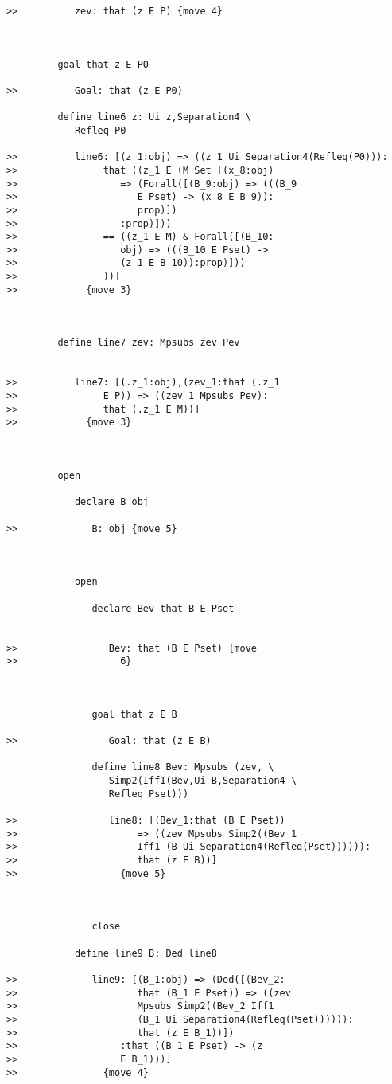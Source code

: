 \documentclass[12pt]{article}
\begin{document}
\begin{verbatim}
>>          zev: that (z E P) {move 4}



         goal that z E P0

>>          Goal: that (z E P0)

         define line6 z: Ui z,Separation4 \
            Refleq P0

>>          line6: [(z_1:obj) => ((z_1 Ui Separation4(Refleq(P0))):
>>               that ((z_1 E (M Set [(x_8:obj)
>>                  => (Forall([(B_9:obj) => (((B_9
>>                     E Pset) -> (x_8 E B_9)):
>>                     prop)])
>>                  :prop)]))
>>               == ((z_1 E M) & Forall([(B_10:
>>                  obj) => (((B_10 E Pset) ->
>>                  (z_1 E B_10)):prop)]))
>>               ))]
>>            {move 3}



         define line7 zev: Mpsubs zev Pev


>>          line7: [(.z_1:obj),(zev_1:that (.z_1
>>               E P)) => ((zev_1 Mpsubs Pev):
>>               that (.z_1 E M))]
>>            {move 3}



         open

            declare B obj

>>             B: obj {move 5}



            open

               declare Bev that B E Pset


>>                Bev: that (B E Pset) {move
>>                  6}



               goal that z E B

>>                Goal: that (z E B)

               define line8 Bev: Mpsubs (zev, \
                  Simp2(Iff1(Bev,Ui B,Separation4 \
                  Refleq Pset)))

>>                line8: [(Bev_1:that (B E Pset))
>>                     => ((zev Mpsubs Simp2((Bev_1
>>                     Iff1 (B Ui Separation4(Refleq(Pset)))))):
>>                     that (z E B))]
>>                  {move 5}



               close

            define line9 B: Ded line8

>>             line9: [(B_1:obj) => (Ded([(Bev_2:
>>                     that (B_1 E Pset)) => ((zev
>>                     Mpsubs Simp2((Bev_2 Iff1
>>                     (B_1 Ui Separation4(Refleq(Pset)))))):
>>                     that (z E B_1))])
>>                  :that ((B_1 E Pset) -> (z
>>                  E B_1)))]
>>               {move 4}




\end{verbatim}
\end{document}
